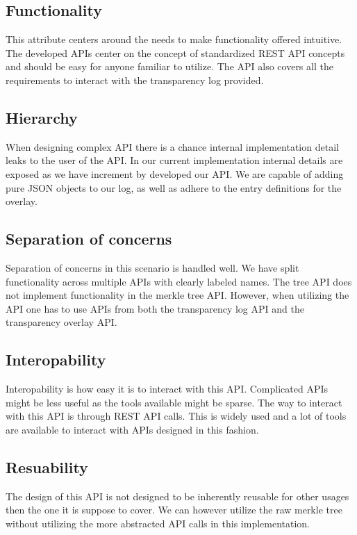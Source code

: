 \documentclass[../Main/thesis.tex]{subfiles}
\begin{document}
\subsection*{Functionality}%
\label{sub:functionality}
This attribute centers around the needs to make functionality offered intuitive.
The developed APIs center on the concept of standardized REST API concepts and
should be easy for anyone familiar to utilize. The API also covers all the
requirements to interact with the transparency log provided.

\subsection*{Hierarchy}%
\label{sub:hierarchy}
When designing complex API there is a chance internal implementation detail
leaks to the user of the API. In our current implementation internal details are
exposed as we have increment by developed our API. We are capable of adding pure
JSON objects to our log, as well as adhere to the entry definitions for the
overlay.

\subsection*{Separation of concerns}%
\label{sub:seperation_of_concerns}
Separation of concerns in this scenario is handled well. We have split
functionality across multiple APIs with clearly labeled names. The tree API does
not implement functionality in the merkle tree API. However, when utilizing the
API one has to use APIs from both the transparency log API and the transparency
overlay API.

\subsection*{Interopability}%
\label{sub:interopability}
Interopability is how easy it is to interact with this API. Complicated APIs
might be less useful as the tools available might be sparse.  The way to
interact with this API is through REST API calls. This is widely used and a lot
of tools are available to interact with APIs designed in this fashion.

\subsection*{Resuability}%
\label{sub:resuability}
The design of this API is not designed to be inherently reusable for other
usages then the one it is suppose to cover. We can however utilize the raw
merkle tree without utilizing the more abstracted API calls in this
implementation.
\end{document}
